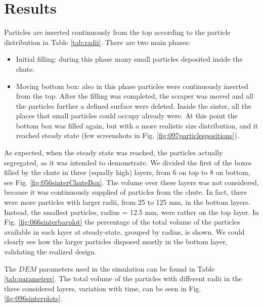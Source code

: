 \section{Results}
\label{sec:results}




Particles are inserted continuously from the top according to the particle
distribution in Table \ref{tab:radii}.
There are two main phases:
\begin{itemize}
  \item{Initial filling: during this phase many small particles deposited inside
  the chute.}
  \item{Moving bottom box: also in this phase particles were
continuously inserted from the top. After the filling was completed, the
scraper was moved and all the particles further a defined surface were
deleted. Inside the sinter, all the places that small particles could
occupy already were. At this point the bottom box was filled again, but
with a more realistic size distribution, and it reached steady state 
(few screenshots in Fig. \ref{fig:097particlespositions}).}
\end{itemize}
As expected, when the steady state was reached, the particles actually
segregated, as it was intended to demonstrate.
We divided the first of the boxes
filled by the chute in three (equally high) layers, from 6 on top to 8 
on bottom, see Fig. \ref{fig:056sinterChuteBox}. 
The volume over these layers was not considered, because it was continuously 
supplied of particles from the chute.
In fact, there were more particles with larger radii, from 25 to 125 mm, in the
bottom layers.
Instead, the smallest particles, radius = 12.5 mm, were rather on the top layer. 
In Fig. \ref{fig:066sinterbarplot} the
percentage of the total volume of the particles available in each layer at steady-state, 
grouped by radius, is shown. 
We could clearly see how the larger particles disposed mostly 
in the bottom layer, validating the realized design.




The $DEM$ parameters used in the simulation can be found in Table
\ref{tab:parameters}.
The total volume of the particles with different radii in the three considered
layers, variation with time, can
be seen in Fig. \ref{fig:096sinterplots}.




